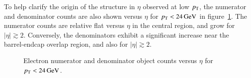 To help clarify the origin of the structure in $\eta$ observed at low $p_{\text{T}}$, the numerator and denominator counts are also shown versus $\eta$ for $p_{\text{T}}<\SI{24}{\giga\electronvolt}$ in figure~\ref{fig:electron-num-den-eta-lowpt}. The numerator counts are relative flat versus $\eta$ in the central region, and grow for $|\eta|\gtrsim 2$. Conversely, the denominators exhibit a significant increase near the barrel-endcap overlap region, and also for $|\eta|\gtrsim 2$. 

\begin{figure}[h]
  \centering
  \caption{Electron numerator and denominator object counts versus $\eta$ for $p_{\text{T}}<\SI{24}{\giga\electronvolt}$.}
  \label{fig:electron-num-den-eta-lowpt}
\end{figure}


